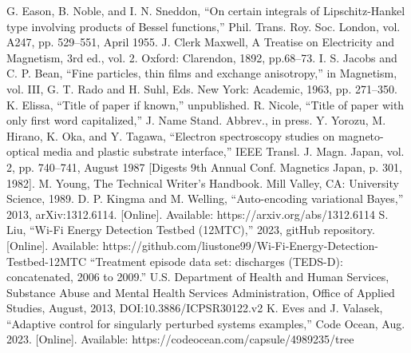 \documentclass[conference]{IEEEtran}
\begin{document}
\begin{thebibliography}{00}
 G. Eason, B. Noble, and I. N. Sneddon, ``On certain integrals of Lipschitz-Hankel type involving products of Bessel functions,'' Phil. Trans. Roy. Soc. London, vol. A247, pp. 529--551, April 1955.
 J. Clerk Maxwell, A Treatise on Electricity and Magnetism, 3rd ed., vol. 2. Oxford: Clarendon, 1892, pp.68--73.
 I. S. Jacobs and C. P. Bean, ``Fine particles, thin films and exchange anisotropy,'' in Magnetism, vol. III, G. T. Rado and H. Suhl, Eds. New York: Academic, 1963, pp. 271--350.
 K. Elissa, ``Title of paper if known,'' unpublished.
 R. Nicole, ``Title of paper with only first word capitalized,'' J. Name Stand. Abbrev., in press.
 Y. Yorozu, M. Hirano, K. Oka, and Y. Tagawa, ``Electron spectroscopy studies on magneto-optical media and plastic substrate interface,'' IEEE Transl. J. Magn. Japan, vol. 2, pp. 740--741, August 1987 [Digests 9th Annual Conf. Magnetics Japan, p. 301, 1982].
 M. Young, The Technical Writer's Handbook. Mill Valley, CA: University Science, 1989.
 D. P. Kingma and M. Welling, ``Auto-encoding variational Bayes,'' 2013, arXiv:1312.6114. [Online]. Available: https://arxiv.org/abs/1312.6114
 S. Liu, ``Wi-Fi Energy Detection Testbed (12MTC),'' 2023, gitHub repository. [Online]. Available: https://github.com/liustone99/Wi-Fi-Energy-Detection-Testbed-12MTC
 ``Treatment episode data set: discharges (TEDS-D): concatenated, 2006 to 2009.'' U.S. Department of Health and Human Services, Substance Abuse and Mental Health Services Administration, Office of Applied Studies, August, 2013, DOI:10.3886/ICPSR30122.v2
 K. Eves and J. Valasek, ``Adaptive control for singularly perturbed systems examples,'' Code Ocean, Aug. 2023. [Online]. Available: https://codeocean.com/capsule/4989235/tree
\end{thebibliography}
\end{document}
